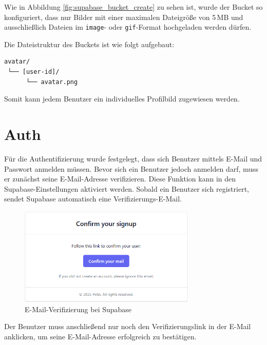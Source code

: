 \begin{inhalt}
Wie in Abbildung \ref{fig:supabase_bucket_create} zu sehen ist, wurde der Bucket so konfiguriert, dass nur Bilder mit einer maximalen Dateigröße von 5\,MB und ausschließlich Dateien im \texttt{image}- oder \texttt{gif}-Format hochgeladen werden dürfen.

Die Dateistruktur des Buckets ist wie folgt aufgebaut:

\begin{lstlisting}[style=mysql]
avatar/
 └── [user-id]/
      └── avatar.png
\end{lstlisting}

Somit kann jedem Benutzer ein individuelles Profilbild zugewiesen werden.

\newpage

\section{Auth}

Für die Authentifizierung wurde festgelegt, dass sich Benutzer mittels E-Mail und Passwort anmelden müssen.  
Bevor sich ein Benutzer jedoch anmelden darf, muss er zunächst seine E-Mail-Adresse verifizieren.  
Diese Funktion kann in den Supabase-Einstellungen aktiviert werden.  
Sobald ein Benutzer sich registriert, sendet Supabase automatisch eine Verifizierungs-E-Mail.

\begin{figure}[!htb]
\centering
\includegraphics[width=0.75\textwidth]{files/Thomas/pics/Datenbank/auth/signup-email.png}
\caption[Supabase E-Mail-Verifizierung]{E-Mail-Verifizierung bei Supabase}
\label{fig:supabase_signup_email}
\end{figure}

Der Benutzer muss anschließend nur noch den Verifizierungslink in der E-Mail anklicken, um seine E-Mail-Adresse erfolgreich zu bestätigen.










\end{inhalt}